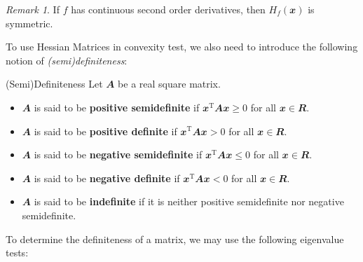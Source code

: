 \documentclass[math, code]{amznotes}
\theoremstyle{remark}
\newtheorem*{remark}{Remark}
\begin{document}
\begin{notebox}
    \begin{remark}
        If $f$ has continuous second order derivatives, then $H_f(\mathbfit{x})$ is symmetric.
    \end{remark}
\end{notebox}
To use Hessian Matrices in convexity test, we also need to introduce the following notion of \textit{(semi)definiteness}:
\begin{dfnbox}{(Semi)Definiteness}
    Let $\mathbfit{A}$ be a real square matrix.
    \begin{itemize}
        \item $\mathbfit{A}$ is said to be {\color{red} \textbf{positive semidefinite}} if $\mathbfit{x}^{\mathrm{T}}\mathbfit{Ax} \geq 0$ for all $\mathbfit{x} \in \mathbfit{R}$.
        \item $\mathbfit{A}$ is said to be {\color{red} \textbf{positive definite}} if $\mathbfit{x}^{\mathrm{T}}\mathbfit{Ax} > 0$ for all $\mathbfit{x} \in \mathbfit{R}$.
        \item $\mathbfit{A}$ is said to be {\color{red} \textbf{negative semidefinite}} if $\mathbfit{x}^{\mathrm{T}}\mathbfit{Ax} \leq 0$ for all $\mathbfit{x} \in \mathbfit{R}$.
        \item $\mathbfit{A}$ is said to be {\color{red} \textbf{negative definite}} if $\mathbfit{x}^{\mathrm{T}}\mathbfit{Ax} < 0$ for all $\mathbfit{x} \in \mathbfit{R}$.
        \item $\mathbfit{A}$ is said to be {\color{red} \textbf{indefinite}} if it is neither positive semidefinite nor negative semidefinite.
    \end{itemize}
\end{dfnbox}
To determine the definiteness of a matrix, we may use the following eigenvalue tests:
\end{document}
